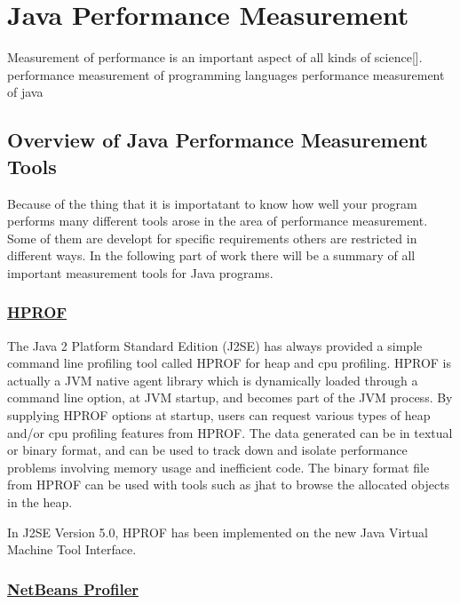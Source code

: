 \chapter{Java Performance Measurement}
\label{chap:introduction}

Measurement of performance is an important aspect of all kinds of science[]. 
performance measurement of programming languages
performance measurement of java 

\section{Overview of Java Performance Measurement Tools}


Because of the thing that it is importatant to know how well your program performs many different tools arose 
in the area of performance measurement. Some of them are developt for specific requirements others are restricted in different ways. In the following part of work there will be a summary of all important measurement tools for Java programs.

\subsection{\href{https://profiler.netbeans.org/}{HPROF}}

The Java 2 Platform Standard Edition (J2SE) has always provided a simple command line profiling tool called HPROF for heap and cpu profiling. HPROF is actually a JVM native agent library which is dynamically loaded through a command line option, at JVM startup, and becomes part of the JVM process. By supplying HPROF options at startup, users can request various types of heap and/or cpu profiling features from HPROF. The data generated can be in textual or binary format, and can be used to track down and isolate performance problems involving memory usage and inefficient code. The binary format file from HPROF can be used with tools such as jhat to browse the allocated objects in the heap.

In J2SE Version 5.0, HPROF has been implemented on the new Java Virtual Machine Tool Interface. 


\subsection{\href{https://profiler.netbeans.org/}{NetBeans Profiler}}

